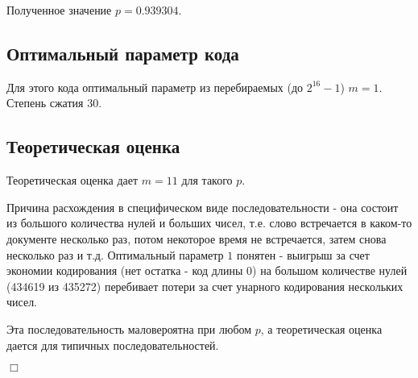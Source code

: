 \documentclass[12pt]{article}
\begin{document}
Полученное значение $p=0.939304$.

\subsection*{Оптимальный параметр кода}

Для этого кода оптимальный параметр из перебираемых (до $2^{16}-1$) $m=1$. Степень сжатия $30$.

\subsection*{Теоретическая оценка}

Теоретическая оценка дает $m=11$ для такого $p$. 

Причина расхождения в специфическом виде последовательности - она состоит из большого количества нулей и больших чисел, т.е. слово встречается в каком-то документе несколько раз, потом некоторое время не встречается, затем снова несколько раз и т.д. Оптимальный параметр $1$ понятен - выигрыш за счет экономии кодирования (нет остатка - код длины 0) на большом количестве нулей (434619 из 435272) перебивает потери за счет унарного кодирования нескольких чисел. 


Эта последовательность маловероятна при любом $p$, а теоретическая оценка дается для типичных последовательностей.

\begin{flushright}
$\Box$
\end{flushright}
\end{document}
